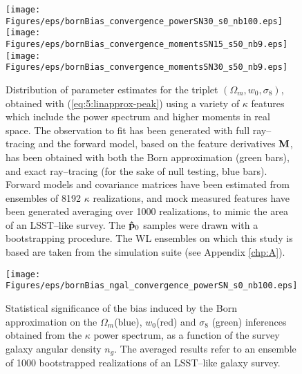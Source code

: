 % 
\begin{figure}
\begin{center}
\texttt{[image: Figures/eps/bornBias\_convergence\_powerSN30\_s0\_nb100.eps]}
\texttt{[image: Figures/eps/bornBias\_convergence\_momentsSN15\_s50\_nb9.eps]}
\texttt{[image: Figures/eps/bornBias\_convergence\_momentsSN30\_s50\_nb9.eps]}
\end{center}
\caption{Distribution of parameter estimates for the triplet $(\Omega_m,w_0,\sigma_8)$, obtained with (\ref{eq:5:linapprox-peak}) using a variety of $\kappa$ features which include the power spectrum and higher moments in real space. The observation to fit has been generated with full ray--tracing and the forward model, based on the feature derivatives $\mathbf{M}$, has been obtained with both the Born approximation (green bars), and exact ray--tracing (for the sake of null testing, blue bars). Forward models and covariance matrices have been estimated from ensembles of 8192 $\kappa$ realizations, and  mock measured features have been generated averaging over 1000 realizations, to mimic the area of an LSST--like survey. The $\mathbf{\hat{p}}_0$ samples were drawn with a bootstrapping procedure. The WL ensembles on which this study is based are taken from the  simulation suite (see Appendix \ref{chp:A}).}
\label{fig:7:biasfeat}
\end{figure}
%
\begin{figure}
\begin{center}
\texttt{[image: Figures/eps/bornBias\_ngal\_convergence\_powerSN\_s0\_nb100.eps]}
\end{center}
\caption{Statistical significance of the bias induced by the Born approximation on the $\Omega_m$(blue), $w_0$(red) and  $\sigma_8$ (green) inferences obtained from the $\kappa$ power spectrum, as a function of the survey galaxy angular density $n_g$. The averaged results refer to an ensemble of 1000 bootstrapped realizations of an LSST--like galaxy survey.}
\label{fig:7:biasbornngal}
\end{figure}
%
